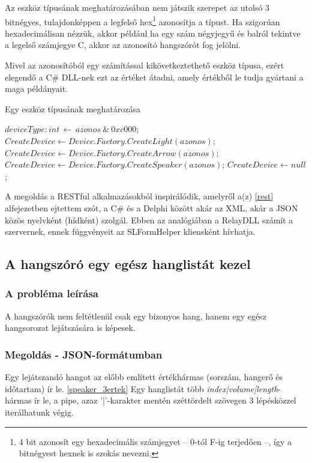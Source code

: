 \documentclass[tocnopagenum]{thesis-ekf}
\begin{document}
	Az eszköz típusának meghatározásában nem játszik szerepet az utolsó 3 bitnégyes, tulajdonképpen a legfelső hex\footnote{4 bit azonosít egy hexadecimális számjegyet -- 0-tól F-ig terjedően --, így a bitnégyest hexnek is szokás nevezni.} azonosítja a típust.
	Ha szigorúan hexadecimálisan nézzük, akkor például ha egy szám négyjegyű és balról tekintve a legelső számjegye C, akkor az azonosító hangszórót fog jelölni.
	
	Mivel az azonosítóból egy számítással kikövetkeztethető eszköz típusa, ezért elegendő a C\# DLL-nek ezt az értéket átadni, amely értékből le tudja gyártani a maga példányait.
	
	\begin{algorithm}
		\caption{Egy eszköz típusának meghatározása}
		\label{algo:createdevice}
		\begin{algorithmic}[0]
			\State $deviceType:int\,\gets\,azonos\ \mathbin{\&}\ 0xc000$; 
				\State $CreateDevice \gets Device.Factory.CreateLight(azonos)$;
				\State $CreateDevice \gets Device.Factory.CreateArrow(azonos)$;
				\State $CreateDevice \gets Device.Factory.CreateSpeaker(azonos)$;
			\Else
				\State $CreateDevice \gets null$;
			\EndIf
		\EndFunction
		\end{algorithmic}
	\end{algorithm}

	A megoldás a RESTful alkalmazásokból inspirálódik, amelyről a(z) \ref{rest} alfejezetben ejtettem szót, a C\# és a Delphi között akár az XML, akár a JSON közös nyelvként (hídként) szolgál. Ebben az analógiában a RelayDLL számít a szervernek, ennek függvényeit az SLFormHelper kliensként hívhatja.
	\subsection{A hangszóró egy egész hanglistát kezel}
	\subsubsection{A probléma leírása} A hangszórók nem feltétlenül csak egy bizonyos hang, hanem egy egész hangsorozat lejátszására is képesek. 
	\subsubsection{Megoldás - JSON-formátumban}
	Egy lejátszandó hangot az előbb említett értékhármas (sorszám, hangerő és időtartam) ír le. \ref{speaker_3ertek}
	Egy hanglistát több \textit{index|volume|length}-hármas ír le, a pipe, azaz '|'-karakter mentén széttördelt szövegen 3 lépésközzel iterálhatunk végig.
	
\end{document}
